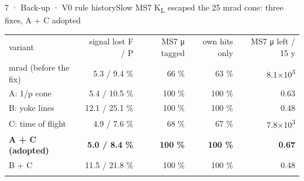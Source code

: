 \begin{btframe}{7 · Back-up · V0 rule history}{Slow MS7 K\textsubscript{L} escaped the 25 mrad cone: three fixes, A + C adopted}
\begin{minipage}[t]{\dimexpr(0.2500\linewidth-0.2500\dimexpr14.22pt\relax)}
\end{minipage}\par
\vspace{2.46pt}
{\fontsize{4.37pt}{5.68pt}\selectfont\setlength{\tabcolsep}{3.06pt}\renewcommand{\arraystretch}{1.42}
\begin{tabularx}{\linewidth}{>{\raggedright\arraybackslash}Xrrrr}
\textcolor{muted}{variant} & \textcolor{muted}{signal lost F / P} & \textcolor{muted}{MS7 μ tagged} & \textcolor{muted}{own hits only} & \textcolor{muted}{MS7 μ left / 15 y} \\\headrule
25 mrad (before the fix) & 5.3 / 9.4 \% & 66 \% & 63 \% & 8.1×10\textsuperscript{3} \\\rowrule
A: 1/p cone & 5.4 / 10.5 \% & 100 \% & 100 \% & 0.63 \\\rowrule
B: yoke lines & 12.1 / 25.1 \% & 100 \% & 100 \% & 0.48 \\\rowrule
C: time of flight & 4.9 / 7.6 \% & 68 \% & 67 \% & 7.8×10\textsuperscript{3} \\\rowrule
\rowcolor{tint}\bfseries A + C (adopted) & \bfseries 5.0 / 8.4 \% & \bfseries 100 \% & \bfseries 100 \% & \bfseries 0.67 \\\rowrule
B + C & 11.5 / 21.8 \% & 100 \% & 100 \% & 0.48 \\\rowrule
\end{tabularx}\par}
\end{btframe}

% 

